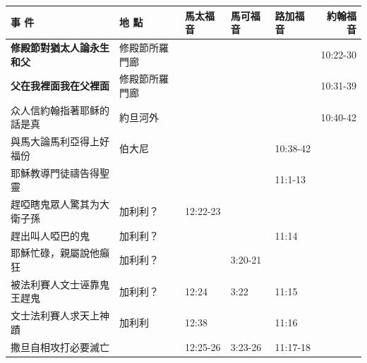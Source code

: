 \begin{table}[H]
  \centering 
    \begin{tabular}{p{13.07em}|l|l|l|p{5.285em}|r}
    \toprule
    \textbf{事 件} & \multicolumn{1}{p{7.93em}|}{\textbf{地 點}} & \multicolumn{1}{p{5.285em}|}{\textbf{馬太福音}} & \multicolumn{1}{p{5.57em}|}{\textbf{馬可福音}} & \textbf{路加福音} & \multicolumn{1}{p{4.855em}}{\textbf{約翰福音}} \\\midrule 



 \textbf{修殿節對猶太人論永生和父} & \multicolumn{1}{p{7.93em}|}{修殿節所羅門廊} &       &       & \multicolumn{1}{r|}{} & \multicolumn{1}{p{4.855em}}{10:22-30} \\\midrule

\textbf{父在我裡面我在父裡面} & \multicolumn{1}{p{7.93em}|}{修殿節所羅門廊} &       &       & \multicolumn{1}{r|}{} & \multicolumn{1}{p{4.855em}}{10:31-39} \\\midrule

众人信約翰指著耶稣的話是真& \multicolumn{1}{p{7.93em}|}{約旦河外} & \multicolumn{1}{p{5.285em}|}{} && &\multicolumn{1}{p{4.855em}}{10:40-42} \\\midrule

與馬大論馬利亞得上好福份 & \multicolumn{1}{p{7.93em}|}{伯大尼} &       &       & 10:38-42 &  \\ \midrule

耶穌教導門徒禱告得聖靈 &       &       &       & 11:1-13 &  \\\midrule

趕啞瞎鬼眾人驚其为大衛子孫&\multicolumn{1}{l|}{加利利？}& 12:22-23&& & \\ \midrule
趕出叫人啞巴的鬼&\multicolumn{1}{l|}{加利利？}& && 11:14& \\ \midrule
耶穌忙碌，親屬說他癲狂&\multicolumn{1}{l|}{加利利？}&& 3:20-21& & \\ \midrule

被法利賽人文士诬靠鬼王趕鬼&\multicolumn{1}{l|}{加利利？}& 12:24& 3:22& 11:15 & \\ \midrule

文士法利賽人求天上神蹟&\multicolumn{1}{l|}{加利利}&12:38&  & 11:16 & \\ \midrule


撒旦自相攻打必要滅亡&\multicolumn{1}{l|}{}& 12:25-26& 3:23-26& 11:17-18& \\ \midrule


\end{tabular}
\end{table}
